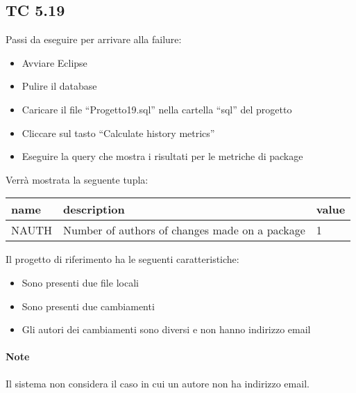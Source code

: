 \subsection*{TC 5.19}
Passi da eseguire per arrivare alla failure:
\begin{itemize}
 \item Avviare Eclipse
 \item Pulire il database
 \item Caricare il file ``Progetto19.sql'' nella cartella ``sql'' del progetto
 \item Cliccare sul tasto ``Calculate history metrics''
 \item Eseguire la query che mostra i risultati per le metriche di package
\end{itemize}
Verrà mostrata la seguente tupla:
\begin{table}[ht]
 \centering
 \footnotesize
 \begin{tabular}{|l|p{8cm}|l|}
  \hline
  \textbf{name}		& \textbf{description}		& \textbf{value}		\\
  \hline
  NAUTH		& Number of authors of changes made on a package	& 	1 \\
  \hline
 \end{tabular} 
\end{table}
\vspace{0.5cm}
\newline
Il progetto di riferimento ha le seguenti caratteristiche:
\begin{itemize}
 \item Sono presenti due file locali
 \item Sono presenti due cambiamenti
 \item Gli autori dei cambiamenti sono diversi e non hanno indirizzo email
\end{itemize}

\paragraph{Note} Il sistema non considera il caso in cui un autore non ha indirizzo email.
